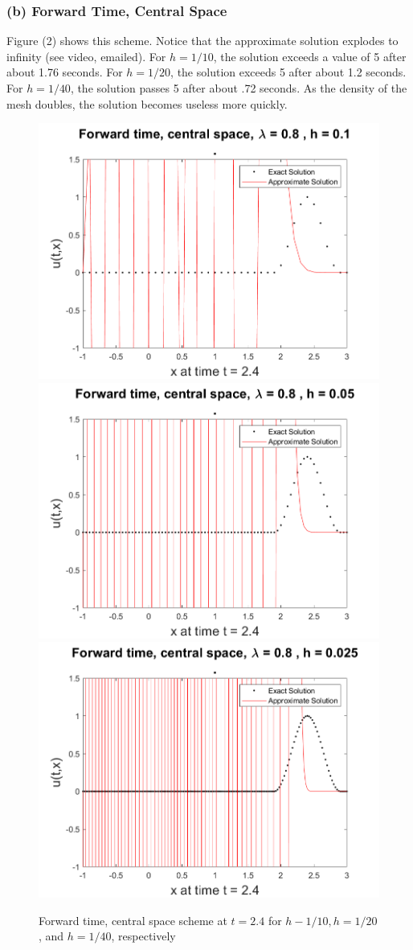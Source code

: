 \documentclass[12pt]{article}
\begin{document}
\subsubsection*{(b) Forward Time, Central Space}

Figure (2) shows this scheme. Notice that the approximate solution explodes to infinity  (see video, emailed). For $h=1/10$, the solution exceeds a value of 5 after about 1.76 seconds. For $h=1/20$, the solution exceeds 5 after about 1.2 seconds. For $h=1/40$, the solution passes 5 after about .72 seconds. As the density of the mesh doubles, the solution becomes useless more quickly.

\begin{figure}
	\centering
	\includegraphics[width=.6\linewidth]{./code/b_forward_time_central_space_1_10th.png}	\includegraphics[width=.6\linewidth]{./code/b_forward_time_central_space_1_20th.png}
	\includegraphics[width=.6\linewidth]{./code/b_forward_time_central_space_1_40th.png}
	\caption{Forward time, central space scheme at $t=2.4$ for $h-1/10, h=1/20$, and $h=1/40$, respectively}
\end{figure}
\end{document}

